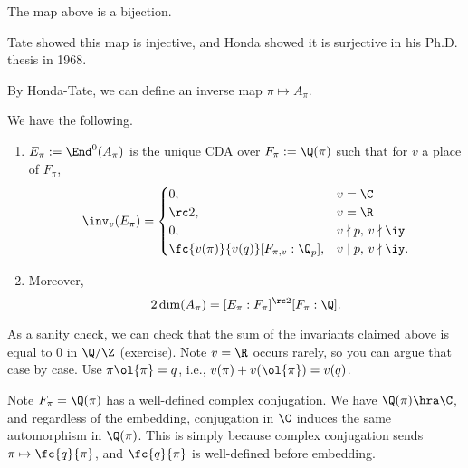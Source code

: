 \begin{thm}
The map above is a bijection.
\end{thm}
Tate showed this map is injective, and Honda showed it is surjective in his Ph.D. thesis in 1968.

By Honda-Tate, we can define an inverse map $\pi\mapsto A_{\pi}$.
\begin{thm}
We have the following.
\begin{enumerate}
\item 
$E_{\pi}:=\End^0(A_{\pi})$ is the unique CDA over $F_{\pi}:=\Q(\pi)$ such that for $v$ a place of $F_{\pi}$, 
\[
\inv_v(E_{\pi})=\begin{cases}
0,&v=\C\\
\rc2,& v=\R\\
0,&v\nmid p,\,v\nmid \iy\\
\fc{v(\pi)}{v(q)}[F_{\pi,v}:\Q_p], & v\mid p,\,v\nmid \iy.
\end{cases}
\]
\item
Moreover,
\[
2\dim(A_{\pi})=[E_{\pi}:F_{\pi}]^{\rc2}[F_{\pi}:\Q].
\]
\end{enumerate}
\end{thm}
As a sanity check, we can check that the sum of the invariants claimed above is equal to 0 in $\Q/\Z$ (exercise). 
Note $v=\R$ occurs rarely, so you can argue that case by case. Use $\pi\ol{\pi}=q$, i.e., $v(\pi)+v(\ol{\pi})=v(q)$. 

Note $F_{\pi}=\Q(\pi)$ has a well-defined complex conjugation. We have $\Q(\pi)\hra \C$, and regardless of the embedding, conjugation in $\C$ induces the same automorphism in $\Q(\pi)$. This is simply because complex conjugation sends $\pi\mapsto \fc{q}{\pi}$, and $\fc{q}{\pi}$ is well-defined before embedding.


